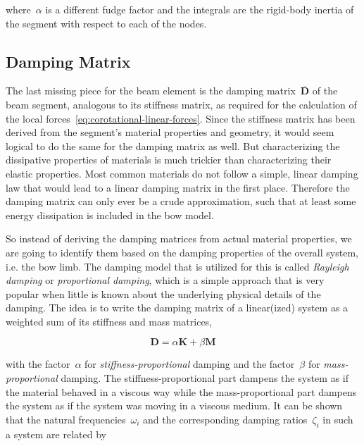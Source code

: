where~$\alpha$ is a different fudge factor and the integrals are the rigid-body inertia of the segment with respect to each of the nodes.

\subsection{Damping Matrix}
\label{sec:rayleigh-damping}

The last missing piece for the beam element is the damping matrix~$\overline{\boldsymbol{D}}$ of the beam segment, analogous to its stiffness matrix, as required for the calculation of the local forces~\eqref{eq:corotational-linear-forces}.
Since the stiffness matrix has been derived from the segment's material properties and geometry, it would seem logical to do the same for the damping matrix as well.
But characterizing the dissipative properties of materials is much trickier than characterizing their elastic properties.
Most common materials do not follow a simple, linear damping law that would lead to a linear damping matrix in the first place.
Therefore the damping matrix can only ever be a crude approximation, such that at least some energy dissipation is included in the bow model.

So instead of deriving the damping matrices from actual material properties, we are going to identify them based on the damping properties of the overall system, i.e. the bow limb.
The damping model that is utilized for this is called \textit{Rayleigh damping} or \textit{proportional damping}, which is a simple approach that is very popular when little is known about the underlying physical details of the damping.
The idea is to write the damping matrix of a linear(ized) system as a weighted sum of its stiffness and mass matrices,

\begin{equation}
\boldsymbol{D} = \alpha\boldsymbol{K} + \beta\boldsymbol{M}\label{eq:rayleigh-damping-matrix}
\end{equation}

with the factor~$\alpha$ for \textit{stiffness-proportional} damping and the factor~$\beta$ for \textit{mass-proportional} damping.
The stiffness-proportional part dampens the system as if the material behaved in a viscous way while the mass-proportional part dampens the system as if the system was moving in a viscous medium.
It can be shown~\cite{bib:rayleigh-damping} that the natural frequencies~$\omega_i$ and the corresponding damping ratios~$\zeta_i$ in such a system are related by 

